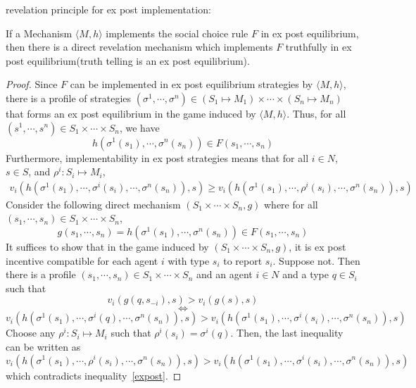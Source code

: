 \begin{prop*}
revelation principle  for ex post implementation:

If a Mechanism $\langle M, h\rangle$ implements the social choice rule $F$ in ex post 
equilibrium, then there is a direct revelation mechanism which implements $F$ truthfully in ex post equilibrium(truth telling is an ex
post equilibrium). 

\end{prop*}
\begin{proof}
 Since $F$ can be implemented in ex post equilibrium strategies by  $\langle M, h\rangle$, there is a profile of strategies $(\sigma^1,\cdots,
 \sigma^n)\in (S_1\mapsto M_1)\times \cdots\times (S_n\mapsto M_n)$ that forms an ex post equilibrium in the game induced by $\langle M, h\rangle$. Thus, for
 all $(s^1, \cdots,s^n)\in S_1\times \cdots\times S_n$, we have
 $$h(\sigma^1(s_1),\cdots,\sigma^n(s_n))\in F(s_1,\cdots,s_n)$$
 Furthermore, implementability in ex post strategies means that for all $i\in N$, $s\in S$, and $\rho^i:S_i\mapsto M_i$,
 \begin{align}\label{expost}
 v_i(h(\sigma^1(s_1),\cdots,\sigma^i(s_i),\cdots,\sigma^n(s_n)),s)\geqslant v_i(h(\sigma^1(s_1),\cdots,\rho^i(s_i),\cdots,\sigma^n(s_n)),s)
 \end{align}
Consider the following direct mechanism $(S_1\times\cdots\times S_n, g)$ where for all $(s_1,\cdots,s_n)\in S_1\times\cdots\times S_n$,
$$g(s_1,\cdots,s_n)=h(\sigma^1(s_1),\cdots,\sigma^n(s_n))\in F(s_1,\cdots,s_n)$$
It suffices to show that in the game induced by $(S_1\times\cdots\times S_n, g)$, it is ex post incentive compatible for each agent 
$i$ with type $s_i$ to report $s_i$. Suppose not. Then there is a profile $(s_1,\cdots,s_n)\in S_1\times\cdots\times S_n$ and an
agent $i\in N$ and a type $q\in S_i$ such that
$$v_i(g(q,s_{-i}),s)>v_i(g(s),s)$$
$$\Longleftrightarrow$$
$$v_i(h(\sigma^1(s_1),\cdots,\sigma^i(q),\cdots,\sigma^n(s_n)),s)>v_i(h(\sigma^1(s_1),\cdots,\sigma^i(s_i),\cdots,\sigma^n(s_n)),s)$$
Choose any $\rho^i:S_i\mapsto M_i$ such that $\rho^i(s_i)=\sigma^i(q)$. Then, the last inequality can be written as
$$v_i(h(\sigma^1(s_1),\cdots,\rho^i(s_i),\cdots,\sigma^n(s_n)),s)>v_i(h(\sigma^1(s_1),\cdots,\sigma^i(s_i),\cdots,\sigma^n(s_n)),s)$$
which contradicts inequality~\ref{expost}.
 \end{proof}